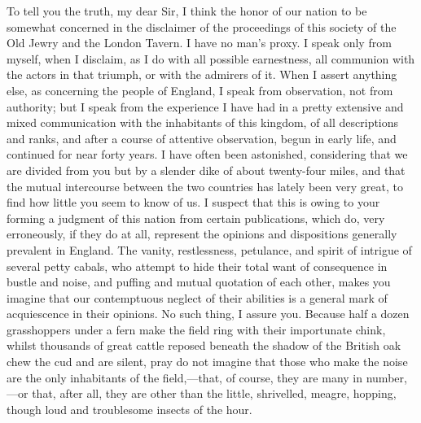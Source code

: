 To tell you the truth, my dear Sir, I think the honor of our nation to be somewhat concerned in the disclaimer of the proceedings of this society of the Old Jewry and the London Tavern. I have no man's proxy. I speak only from myself, when I disclaim, as I do with all possible earnestness, all communion with the actors in that triumph, or with the admirers of it. When I assert anything else, as concerning the people of England, I speak from observation, not from authority; but I speak from the experience I have had in a pretty extensive and mixed communication with the inhabitants of this kingdom, of all descriptions and ranks, and after a course of attentive observation, begun in early life, and continued for near forty years. I have often been astonished, considering that we are divided from you but by a slender dike of about twenty-four miles, and that the mutual intercourse between the two countries has lately been very great, to find how little you seem to know of us. I suspect that this is owing to your forming a judgment of this nation from certain publications, which do, very erroneously, if they do at all, represent the opinions and dispositions generally prevalent in England. The vanity, restlessness, petulance, and spirit of intrigue of several petty cabals, who attempt to hide their total want of consequence in bustle and noise, and puffing and mutual quotation of each other, makes you imagine that our contemptuous neglect of their abilities is a general mark of acquiescence in their opinions. No such thing, I assure you. Because half a dozen grasshoppers under a fern make the field ring with their importunate chink, whilst thousands of great cattle reposed beneath the shadow of the British oak chew the cud and are silent, pray do not imagine that those who make the noise are the only inhabitants of the field,—that, of course, they are many in number,—or that, after all, they are other than the little, shrivelled, meagre, hopping, though loud and troublesome insects of the hour.

